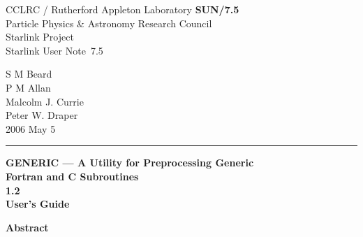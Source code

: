 \documentclass[twoside,11pt]{article}
\newcommand{\stardoccategory}  {Starlink User Note}
\newcommand{\stardocinitials}  {SUN}
\newcommand{\stardocnumber}    {7.5}
\newcommand{\stardocauthors}   {S M Beard \\ P M Allan\\ Malcolm J. Currie\\ Peter W. Draper}
\newcommand{\stardocdate}      {2006 May 5}
\newcommand{\stardoctitle}     {GENERIC --- A Utility for Preprocessing Generic
				\\ Fortran and C Subroutines}
\newcommand{\stardocversion}   {1.2}
\newcommand{\stardocmanual}    {User's Guide}
\newcommand{\stardocname}{\stardocinitials /\stardocnumber}
\renewcommand{\_}{{\tt\char'137}}     %
\newenvironment{latexonly}{}{}
\begin{document}
\thispagestyle{empty}

\begin{latexonly}
   CCLRC / {\sc Rutherford Appleton Laboratory} \hfill {\bf \stardocname}\\
   {\large Particle Physics \& Astronomy Research Council}\\
   {\large Starlink Project\\}
   {\large \stardoccategory\ \stardocnumber}
   \begin{flushright}
   \stardocauthors\\
   \stardocdate
   \end{flushright}
   \vspace{-4mm}
   \rule{\textwidth}{0.5mm}
   \vspace{5mm}
   \begin{center}
   {\Huge\bf  \stardoctitle \\ [2.5ex]}
   {\LARGE\bf \stardocversion \\ [4ex]}
   {\Huge\bf  \stardocmanual}
   \end{center}
   \vspace{5mm}

   \vspace{10mm}
   \begin{center}
      {\Large\bf Abstract}
   \end{center}
\end{latexonly}
\end{document}
